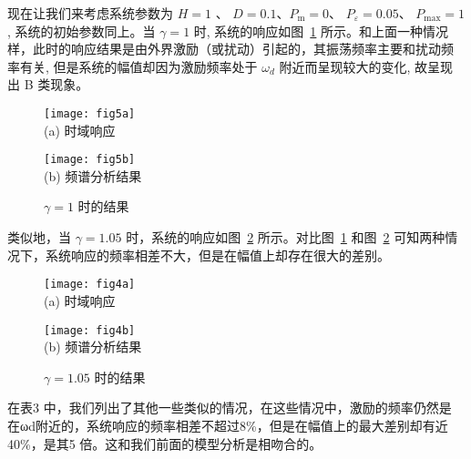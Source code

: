 \documentclass[withoutpreface,bwprint]{cumcmthesis} %
\begin{document}
现在让我们来考虑系统参数为 $ H=1$ 、 $D=0.1 $、$ P_{\mathrm{m}}=0 $、 $P_{\varepsilon}=0.05 $、 $P_{\max }=1 $,
系统的初始参数同上。当 $ \gamma=1 $ 时, 系统的响应如图~\ref{fig10} 所示。和上面一种情况 样，此时的响应结果是由外界激励（或扰动）引起的，其振荡频率主要和扰动频 率有关, 但是系统的幅值却因为激励频率处于  $\omega_{d}$  附近而呈现较大的变化, 故呈现 出 B 类现象。

\begin{figure}[h!t]
\begin{minipage}{0.48\linewidth}
  \centering
  {
  \texttt{[image: fig5a]}\\
  (a) 时域响应
  }
\end{minipage}\hfill
\begin{minipage}{0.48\linewidth}
  \centering
  {
  \texttt{[image: fig5b]}\\
  (b) 频谱分析结果
  }
\end{minipage}
    \caption{$\gamma=1$ 时的结果}
    \label{fig10}
    \end{figure}

    类似地，当 $\gamma=1.05$ 时，系统的响应如图~\ref{fig11} 所示。对比图~\ref{fig10} 和图~\ref{fig11} 可知两种情况下，系统响应的频率相差不大，但是在幅值上却存在很大的差别。

\begin{figure}[h!t]
\begin{minipage}{0.48\linewidth}
  \centering
  {
  \texttt{[image: fig4a]}\\
  (a) 时域响应
  }
\end{minipage}\hfill
\begin{minipage}{0.48\linewidth}
  \centering
  {
  \texttt{[image: fig4b]}\\
  (b) 频谱分析结果
  }
\end{minipage}
    \caption{$\gamma=1.05$ 时的结果}
    \label{fig11}
    \end{figure}

在表3 中，我们列出了其他一些类似的情况，在这些情况中，激励的频率仍然是
在ωd附近的，系统响应的频率相差不超过8\%，但是在幅值上的最大差别却有近
40\%，是其5 倍。这和我们前面的模型分析是相吻合的。
\end{document}
